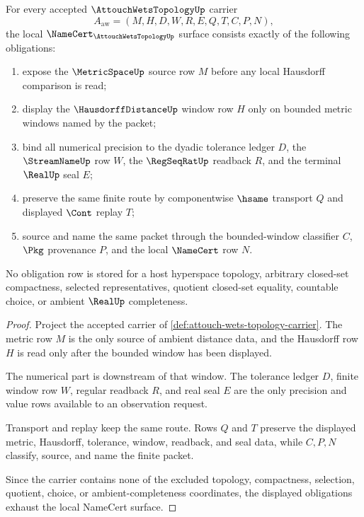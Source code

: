 \begin{theorem}
\label{thm:attouch-wets-topology-namecert-obligation-surface}
For every accepted $\AttouchWetsTopologyUp$ carrier
$$
A_{\mathrm{aw}}=(M,H,D,W,R,E,Q,T,C,P,N),
$$
the local $\NameCert_{\AttouchWetsTopologyUp}$ surface consists exactly of the following obligations:
\begin{enumerate}
\item expose the $\MetricSpaceUp$ source row $M$ before any local Hausdorff comparison is read;
\item display the $\HausdorffDistanceUp$ window row $H$ only on bounded metric windows named by the packet;
\item bind all numerical precision to the dyadic tolerance ledger $D$, the $\StreamNameUp$ row $W$, the $\RegSeqRatUp$ readback $R$, and the terminal $\RealUp$ seal $E$;
\item preserve the same finite route by componentwise $\hsame$ transport $Q$ and displayed $\Cont$ replay $T$;
\item source and name the same packet through the bounded-window classifier $C$, $\Pkg$ provenance $P$, and the local $\NameCert$ row $N$.
\end{enumerate}
No obligation row is stored for a host hyperspace topology, arbitrary closed-set compactness, selected representatives, quotient closed-set equality, countable choice, or ambient $\RealUp$ completeness.
\end{theorem}
\begin{proof}
Project the accepted carrier of \autoref{def:attouch-wets-topology-carrier}. The metric row $M$ is the only source of ambient distance data, and the Hausdorff row $H$ is read only after the bounded window has been displayed.

The numerical part is downstream of that window. The tolerance ledger $D$, finite window row $W$, regular readback $R$, and real seal $E$ are the only precision and value rows available to an observation request.

Transport and replay keep the same route. Rows $Q$ and $T$ preserve the displayed metric, Hausdorff, tolerance, window, readback, and seal data, while $C,P,N$ classify, source, and name the finite packet.

Since the carrier contains none of the excluded topology, compactness, selection, quotient, choice, or ambient-completeness coordinates, the displayed obligations exhaust the local NameCert surface.
\end{proof}


